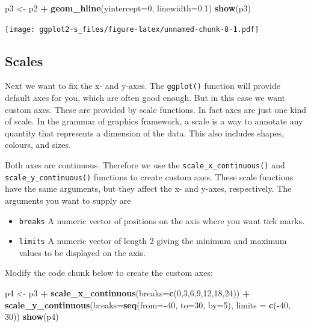 \documentclass[
]{book}
\newenvironment{Shaded}{\begin{snugshade}}{\end{snugshade}}
\newcommand{\AttributeTok}[1]{\textcolor[rgb]{0.13,0.29,0.53}{#1}}
\newcommand{\DecValTok}[1]{\textcolor[rgb]{0.00,0.00,0.81}{#1}}
\newcommand{\FloatTok}[1]{\textcolor[rgb]{0.00,0.00,0.81}{#1}}
\newcommand{\FunctionTok}[1]{\textcolor[rgb]{0.13,0.29,0.53}{\textbf{#1}}}
\newcommand{\NormalTok}[1]{#1}
\newcommand{\OtherTok}[1]{\textcolor[rgb]{0.56,0.35,0.01}{#1}}
\newcommand{\SpecialCharTok}[1]{\textcolor[rgb]{0.81,0.36,0.00}{\textbf{#1}}}
\providecommand{\tightlist}{%
  \setlength{\itemsep}{0pt}\setlength{\parskip}{0pt}}
\begin{document}
\begin{Shaded}
\begin{Highlighting}[]
\NormalTok{p3 }\OtherTok{\textless{}{-}}\NormalTok{ p2 }\SpecialCharTok{+} \FunctionTok{geom\_hline}\NormalTok{(}\AttributeTok{yintercept=}\DecValTok{0}\NormalTok{, }\AttributeTok{linewidth=}\FloatTok{0.1}\NormalTok{)}
\FunctionTok{show}\NormalTok{(p3)}
\end{Highlighting}
\end{Shaded}

\texttt{[image: ggplot2-s\_files/figure-latex/unnamed-chunk-8-1.pdf]}

\subsection{Scales}\label{scales}

Next we want to fix the x- and y-axes. The \texttt{ggplot()} function will provide default axes for you, which are often good enough. But in this case we want custom axes. These are provided by scale functions. In fact axes are just one kind of scale. In the grammar of graphics framework, a scale is a way to annotate any quantity that represents a dimension of the data. This also includes shapes, colours, and sizes.

Both axes are continuous. Therefore we use the \texttt{scale\_x\_continuous()} and \texttt{scale\_y\_continuous()} functions to create custom axes. These scale functions have the same arguments, but they affect the x- and y-axes, respectively. The arguments you want to supply are

\begin{itemize}
\tightlist
\item
  \texttt{breaks} A numeric vector of positions on the axis where you want tick marks.
\item
  \texttt{limits} A numeric vector of length 2 giving the minimum and maximum values to be displayed on the axis.
\end{itemize}

Modify the code chunk below to create the custom axes:

\begin{Shaded}
\begin{Highlighting}[]
\NormalTok{p4 }\OtherTok{\textless{}{-}}\NormalTok{ p3 }\SpecialCharTok{+} \FunctionTok{scale\_x\_continuous}\NormalTok{(}\AttributeTok{breaks=}\FunctionTok{c}\NormalTok{(}\DecValTok{0}\NormalTok{,}\DecValTok{3}\NormalTok{,}\DecValTok{6}\NormalTok{,}\DecValTok{9}\NormalTok{,}\DecValTok{12}\NormalTok{,}\DecValTok{18}\NormalTok{,}\DecValTok{24}\NormalTok{)) }\SpecialCharTok{+}
  \FunctionTok{scale\_y\_continuous}\NormalTok{(}\AttributeTok{breaks=}\FunctionTok{seq}\NormalTok{(}\AttributeTok{from=}\SpecialCharTok{{-}}\DecValTok{40}\NormalTok{, }\AttributeTok{to=}\DecValTok{30}\NormalTok{, }\AttributeTok{by=}\DecValTok{5}\NormalTok{),}
                              \AttributeTok{limits =} \FunctionTok{c}\NormalTok{(}\SpecialCharTok{{-}}\DecValTok{40}\NormalTok{, }\DecValTok{30}\NormalTok{))}
\FunctionTok{show}\NormalTok{(p4)}
\end{Highlighting}
\end{Shaded}
\end{document}
